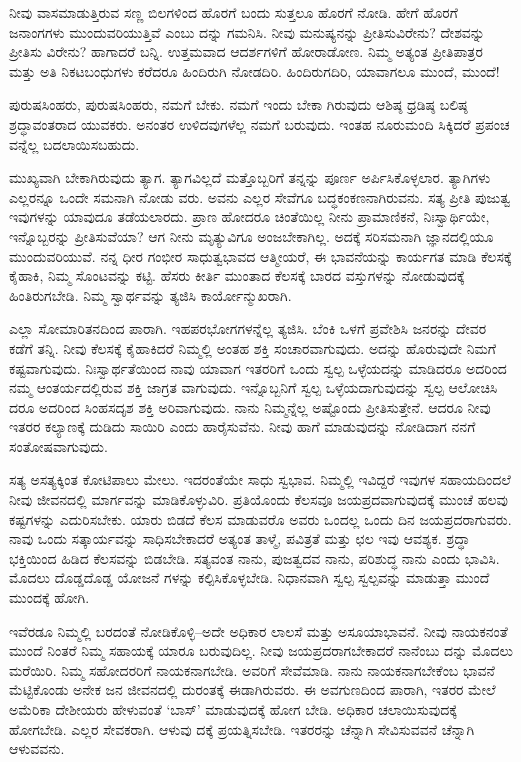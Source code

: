 ನೀವು ವಾಸಮಾಡುತ್ತಿರುವ ಸಣ್ಣ ಬಿಲಗಳಿಂದ ಹೊರಗೆ ಬಂದು ಸುತ್ತಲೂ ಹೊರಗೆ ನೋಡಿ. ಹೇಗೆ ಹೊರಗೆ ಜನಾಂಗಗಳು ಮುಂದುವರಿಯುತ್ತಿವೆ ಎಂಬು ದನ್ನು ಗಮನಿಸಿ. ನೀವು ಮನುಷ್ಯನನ್ನು ಪ್ರೀತಿಸುವಿರೇನು? ದೇಶವನ್ನು ಪ್ರೀತಿಸು ವಿರೇನು? ಹಾಗಾದರೆ ಬನ್ನಿ. ಉತ್ತಮವಾದ ಆದರ್ಶಗಳಿಗೆ ಹೋರಾಡೋಣ. ನಿಮ್ಮ ಅತ್ಯಂತ ಪ್ರೀತಿಪಾತ್ರರ ಮತ್ತು ಅತಿ ನಿಕಟಬಂಧುಗಳು ಕರೆದರೂ ಹಿಂದಿರುಗಿ ನೋಡದಿರಿ. ಹಿಂದಿರುಗದಿರಿ, ಯಾವಾಗಲೂ ಮುಂದೆ, ಮುಂದೆ!

ಪುರುಷಸಿಂಹರು, ಪುರುಷಸಿಂಹರು, ನಮಗೆ ಬೇಕು. ನಮಗೆ ಇಂದು ಬೇಕಾ ಗಿರುವುದು ಆಶಿಷ್ಠ ಧ್ರಡಿಷ್ಠ ಬಲಿಷ್ಠ ಶ್ರದ್ಧಾವಂತರಾದ ಯುವಕರು. ಅನಂತರ ಉಳಿದವುಗಳೆಲ್ಲ ನಮಗೆ ಬರುವುದು. ಇಂತಹ ನೂರುಮಂದಿ ಸಿಕ್ಕಿದರೆ ಪ್ರಪಂಚ ವನ್ನೆಲ್ಲ ಬದಲಾಯಿಸಬಹುದು.

ಮುಖ್ಯವಾಗಿ ಬೇಕಾಗಿರುವುದು ತ್ಯಾಗ. ತ್ಯಾಗವಿಲ್ಲದೆ ಮತ್ತೊಬ್ಬರಿಗೆ ತನ್ನನ್ನು ಪೂರ್ಣ ಅರ್ಪಿಸಿಕೊಳ್ಳಲಾರ. ತ್ಯಾಗಿಗಳು ಎಲ್ಲರನ್ನೂ ಒಂದೇ ಸಮನಾಗಿ ನೋಡು ವರು. ಅವನು ಎಲ್ಲರ ಸೇವೆಗೂ ಬದ್ಧಕಂಕಣನಾಗಿರುವನು. ಸತ್ಯ ಪ್ರೀತಿ ಪುಜುತ್ವ ಇವುಗಳನ್ನು ಯಾವುದೂ ತಡೆಯಲಾರದು. ಪ್ರಾಣ ಹೋದರೂ ಚಿಂತೆಯಿಲ್ಲ ನೀನು ಪ್ರಾಮಾಣಿಕನೆ, ನಿಃಸ್ವಾರ್ಥಿಯೇ, ಇನ್ನೊಬ್ಬರನ್ನು ಪ್ರೀತಿಸುವೆಯಾ? ಆಗ ನೀನು ಮೃತ್ಯುವಿಗೂ ಅಂಜಬೇಕಾಗಿಲ್ಲ. ಅದಕ್ಕೆ ಸರಿಸಮನಾಗಿ ಜ್ಞಾನದಲ್ಲಿಯೂ ಮುಂದುವರಿಯುವೆ. ನನ್ನ ಧೀರ ಗಂಭೀರ ಸಾಧುತ್ವಭಾವದ ಆತ್ಮೀಯರೆ, ಈ ಭಾವನೆಯನ್ನು ಕಾರ್ಯಗತ ಮಾಡಿ ಕೆಲಸಕ್ಕೆ ಕೈಹಾಕಿ, ನಿಮ್ಮ ಸೊಂಟವನ್ನು ಕಟ್ಟಿ. ಹೆಸರು ಕೀರ್ತಿ ಮುಂತಾದ ಕೆಲಸಕ್ಕೆ ಬಾರದ ವಸ್ತುಗಳನ್ನು ನೋಡುವುದಕ್ಕೆ ಹಿಂತಿರುಗಬೇಡಿ. ನಿಮ್ಮ ಸ್ವಾರ್ಥವನ್ನು ತ್ಯಜಿಸಿ ಕಾರ್ಯೋನ್ಮುಖರಾಗಿ.

ಎಲ್ಲಾ ಸೋಮಾರಿತನದಿಂದ ಪಾರಾಗಿ. ಇಹಪರಭೋಗಗಳನ್ನೆಲ್ಲ ತ್ಯಜಿಸಿ. ಬೆಂಕಿ ಒಳಗೆ ಪ್ರವೇಶಿಸಿ ಜನರನ್ನು ದೇವರ ಕಡೆಗೆ ತನ್ನಿ. ನೀವು ಕೆಲಸಕ್ಕೆ ಕೈಹಾಕಿದರೆ ನಿಮ್ಮಲ್ಲಿ ಅಂತಹ ಶಕ್ತಿ ಸಂಚಾರವಾಗುವುದು. ಅದನ್ನು ಹೊರುವುದೇ ನಿಮಗೆ ಕಷ್ಟವಾಗುವುದು. ನಿಃಸ್ವಾರ್ಥತೆಯಿಂದ ನಾವು ಯಾವಾಗ ಇತರರಿಗೆ ಒಂದು ಸ್ವಲ್ಪ ಒಳ್ಳೆಯದನ್ನು ಮಾಡಿದರೂ ಅದರಿಂದ ನಮ್ಮ ಆಂತರ್ಯದಲ್ಲಿರುವ ಶಕ್ತಿ ಜಾಗ್ರತ ವಾಗುವುದು. ಇನ್ನೊಬ್ಬನಿಗೆ ಸ್ವಲ್ಪ ಒಳ್ಳೆಯದಾಗುವುದನ್ನು ಸ್ವಲ್ಪ ಆಲೋಚಿಸಿ ದರೂ ಅದರಿಂದ ಸಿಂಹಸದೃಶ ಶಕ್ತಿ ಅರಿವಾಗುವುದು. ನಾನು ನಿಮ್ಮನ್ನೆಲ್ಲ ಅಷ್ಟೊಂದು ಪ್ರೀತಿಸುತ್ತೇನೆ. ಆದರೂ ನೀವು ಇತರರ ಕಲ್ಯಾಣಕ್ಕೆ ದುಡಿದು ಸಾಯಿರಿ ಎಂದು ಹಾರೈಸುವೆನು. ನೀವು ಹಾಗೆ ಮಾಡುವುದನ್ನು ನೋಡಿದಾಗ ನನಗೆ ಸಂತೋಷವಾಗುವುದು.

ಸತ್ಯ ಅಸತ್ಯಕ್ಕಿಂತ ಕೋಟಿಪಾಲು ಮೇಲು. ಇದರಂತೆಯೇ ಸಾಧು ಸ್ವಭಾವ. ನಿಮ್ಮಲ್ಲಿ ಇವಿದ್ದರೆ ಇವುಗಳ ಸಹಾಯದಿಂದಲೆ ನೀವು ಜೀವನದಲ್ಲಿ ಮಾರ್ಗವನ್ನು ಮಾಡಿಕೊಳ್ಳುವಿರಿ. ಪ್ರತಿಯೊಂದು ಕೆಲಸವೂ ಜಯಪ್ರದವಾಗುವುದಕ್ಕೆ ಮುಂಚೆ ಹಲವು ಕಷ್ಟಗಳನ್ನು ಎದುರಿಸಬೇಕು. ಯಾರು ಬಿಡದೆ ಕೆಲಸ ಮಾಡುವರೊ ಅವರು ಒಂದಲ್ಲ ಒಂದು ದಿನ ಜಯಪ್ರದರಾಗುವರು. ನಾವು ಒಂದು ಸತ್ಕಾರ್ಯವನ್ನು ಸಾಧಿಸಬೇಕಾದರೆ ಅತ್ಯಂತ ತಾಳ್ಮೆ, ಪವಿತ್ರತೆ ಮತ್ತು ಛಲ ಇವು ಆವಶ್ಯಕ. ಶ್ರದ್ಧಾ ಭಕ್ತಿಯಿಂದ ಹಿಡಿದ ಕೆಲಸವನ್ನು ಬಿಡಬೇಡಿ. ಸತ್ಯವಂತ ನಾನು, ಪುಜತ್ವದವ ನಾನು, ಪರಿಶುದ್ಧ ನಾನು ಎಂದು ಭಾವಿಸಿ. ಮೊದಲು ದೊಡ್ಡದೊಡ್ಡ ಯೋಜನೆ ಗಳನ್ನು ಕಲ್ಪಿಸಿಕೊಳ್ಳಬೇಡಿ. ನಿಧಾನವಾಗಿ ಸ್ವಲ್ಪ ಸ್ವಲ್ಪವನ್ನು ಮಾಡುತ್ತಾ ಮುಂದೆ ಮುಂದಕ್ಕೆ ಹೋಗಿ.

ಇವೆರಡೂ ನಿಮ್ಮಲ್ಲಿ ಬರದಂತೆ ನೋಡಿಕೊಳ್ಳಿ–ಅದೇ ಅಧಿಕಾರ ಲಾಲಸೆ ಮತ್ತು ಅಸೂಯಾಭಾವನೆ. ನೀವು ನಾಯಕನಂತೆ ಮುಂದೆ ನಿಂತರೆ ನಿಮ್ಮ ಸಹಾಯಕ್ಕೆ ಯಾರೂ ಬರುವುದಿಲ್ಲ. ನೀವು ಜಯಪ್ರದರಾಗಬೇಕಾದರೆ ನಾನೆಂಬು ದನ್ನು ಮೊದಲು ಮರೆಯಿರಿ. ನಿಮ್ಮ ಸಹೋದರರಿಗೆ ನಾಯಕನಾಗಬೇಡಿ. ಅವರಿಗೆ ಸೇವೆಮಾಡಿ. ನಾನು ನಾಯಕನಾಗಬೇಕೆಂಬ ಭಾವನೆ ಮೆಟ್ಟಿಕೊಂಡು ಅನೇಕ ಜನ ಜೀವನದಲ್ಲಿ ದುರಂತಕ್ಕೆ ಈಡಾಗಿರುವರು. ಈ ಅವಗುಣದಿಂದ ಪಾರಾಗಿ, ಇತರರ ಮೇಲೆ ಅಮೆರಿಕಾ ದೇಶೀಯರು ಹೇಳುವಂತೆ ‘ಬಾಸ್​’ ಮಾಡುವುದಕ್ಕೆ ಹೋಗ ಬೇಡಿ. ಅಧಿಕಾರ ಚಲಾಯಿಸುವುದಕ್ಕೆ ಹೋಗಬೇಡಿ. ಎಲ್ಲರ ಸೇವಕರಾಗಿ. ಆಳುವು ದಕ್ಕೆ ಪ್ರಯತ್ನಿಸಬೇಡಿ. ಇತರರನ್ನು ಚೆನ್ನಾಗಿ ಸೇವಿಸುವವನೆ ಚೆನ್ನಾಗಿ ಆಳುವವನು.

